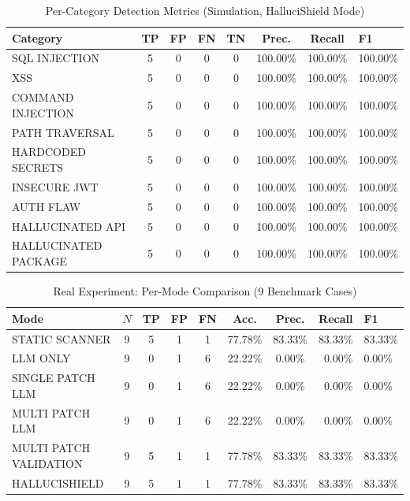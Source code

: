 \begin{table}[htbp]
\centering
\caption{Per-Category Detection Metrics (Simulation, HalluciShield Mode)}
\label{tab:per_category_sim}
\begin{tabular}{lcccccc}
\toprule
Category & TP & FP & FN & TN & Prec. & Recall & F1 \\
\midrule
SQL INJECTION & 5 & 0 & 0 & 0 & 100.00\% & 100.00\% & 100.00\% \\
XSS & 5 & 0 & 0 & 0 & 100.00\% & 100.00\% & 100.00\% \\
COMMAND INJECTION & 5 & 0 & 0 & 0 & 100.00\% & 100.00\% & 100.00\% \\
PATH TRAVERSAL & 5 & 0 & 0 & 0 & 100.00\% & 100.00\% & 100.00\% \\
HARDCODED SECRETS & 5 & 0 & 0 & 0 & 100.00\% & 100.00\% & 100.00\% \\
INSECURE JWT & 5 & 0 & 0 & 0 & 100.00\% & 100.00\% & 100.00\% \\
AUTH FLAW & 5 & 0 & 0 & 0 & 100.00\% & 100.00\% & 100.00\% \\
HALLUCINATED API & 5 & 0 & 0 & 0 & 100.00\% & 100.00\% & 100.00\% \\
HALLUCINATED PACKAGE & 5 & 0 & 0 & 0 & 100.00\% & 100.00\% & 100.00\% \\
\bottomrule
\end{tabular}
\end{table}

\begin{table}[htbp]
\centering
\caption{Real Experiment: Per-Mode Comparison (9 Benchmark Cases)}
\label{tab:real_per_mode}
\begin{tabular}{lccccccr}
\toprule
Mode & $N$ & TP & FP & FN & Acc. & Prec. & Recall & F1 \\
\midrule
STATIC SCANNER & 9 & 5 & 1 & 1 & 77.78\% & 83.33\% & 83.33\% & 83.33\% \\
LLM ONLY & 9 & 0 & 1 & 6 & 22.22\% & 0.00\% & 0.00\% & 0.00\% \\
SINGLE PATCH LLM & 9 & 0 & 1 & 6 & 22.22\% & 0.00\% & 0.00\% & 0.00\% \\
MULTI PATCH LLM & 9 & 0 & 1 & 6 & 22.22\% & 0.00\% & 0.00\% & 0.00\% \\
MULTI PATCH VALIDATION & 9 & 5 & 1 & 1 & 77.78\% & 83.33\% & 83.33\% & 83.33\% \\
HALLUCISHIELD & 9 & 5 & 1 & 1 & 77.78\% & 83.33\% & 83.33\% & 83.33\% \\
\bottomrule
\end{tabular}
\end{table}

